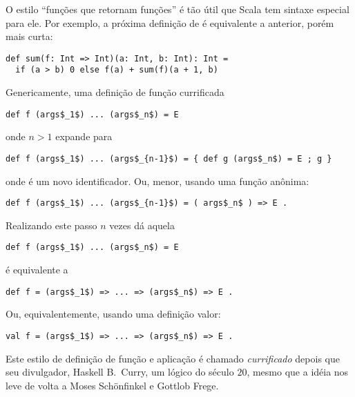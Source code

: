 O estilo ``fun\c{c}\~{o}es que retornam fun\c{c}\~{o}es'' \'{e} t\~{a}o \'{u}til que Scala tem sintaxe
especial para ele. Por exemplo, a pr\'{o}xima defini\c{c}\~{a}o de  \'{e} equivalente
a anterior, por\'{e}m mais curta: 
\begin{lstlisting}
def sum(f: Int => Int)(a: Int, b: Int): Int =
  if (a > b) 0 else f(a) + sum(f)(a + 1, b)
\end{lstlisting}
Genericamente, uma defini\c{c}\~{a}o de fun\c{c}\~{a}o currificada
\begin{lstlisting}
def f (args$_1$) ... (args$_n$) = E
\end{lstlisting}
onde $n > 1$ expande para 
\begin{lstlisting}
def f (args$_1$) ... (args$_{n-1}$) = { def g (args$_n$) = E ; g }
\end{lstlisting}
onde  \'{e} um novo identificador. Ou, menor, usando uma fun\c{c}\~{a}o an\^{o}nima: 
\begin{lstlisting}
def f (args$_1$) ... (args$_{n-1}$) = ( args$_n$ ) => E .
\end{lstlisting}
Realizando este passo $n$ vezes d\'{a} aquela 
\begin{lstlisting}
def f (args$_1$) ... (args$_n$) = E
\end{lstlisting}
\'{e} equivalente a 
\begin{lstlisting}
def f = (args$_1$) => ... => (args$_n$) => E .
\end{lstlisting}
Ou, equivalentemente, usando uma defini\c{c}\~{a}o valor:
\begin{lstlisting}
val f = (args$_1$) => ... => (args$_n$) => E .
\end{lstlisting}
Este estilo de defini\c{c}\~{a}o de fun\c{c}\~{a}o e aplica\c{c}\~{a}o \'{e} chamado {\em currificado}
depois que seu divulgador, Haskell B.\ Curry, um l\'{o}gico do s\'{e}culo $20$, mesmo 
que a id\'{e}ia nos leve de volta a Moses Sch\"onfinkel e Gottlob Frege.

